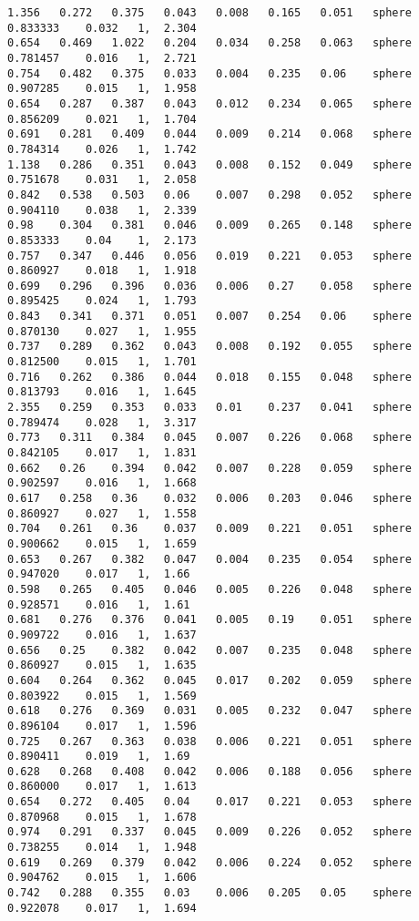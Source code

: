 {\begin{lstlisting}[caption={Datos obtenidos para la prueba de la esfera usando AGC.}]
1.356	0.272	0.375	0.043	0.008	0.165	0.051	sphere	0.833333	0.032	1, 	2.304
0.654	0.469	1.022	0.204	0.034	0.258	0.063	sphere	0.781457	0.016	1, 	2.721
0.754	0.482	0.375	0.033	0.004	0.235	0.06	sphere	0.907285	0.015	1, 	1.958
0.654	0.287	0.387	0.043	0.012	0.234	0.065	sphere	0.856209	0.021	1, 	1.704
0.691	0.281	0.409	0.044	0.009	0.214	0.068	sphere	0.784314	0.026	1, 	1.742
1.138	0.286	0.351	0.043	0.008	0.152	0.049	sphere	0.751678	0.031	1, 	2.058
0.842	0.538	0.503	0.06	0.007	0.298	0.052	sphere	0.904110	0.038	1, 	2.339
0.98	0.304	0.381	0.046	0.009	0.265	0.148	sphere	0.853333	0.04	1, 	2.173
0.757	0.347	0.446	0.056	0.019	0.221	0.053	sphere	0.860927	0.018	1, 	1.918
0.699	0.296	0.396	0.036	0.006	0.27	0.058	sphere	0.895425	0.024	1, 	1.793
0.843	0.341	0.371	0.051	0.007	0.254	0.06	sphere	0.870130	0.027	1, 	1.955
0.737	0.289	0.362	0.043	0.008	0.192	0.055	sphere	0.812500	0.015	1, 	1.701
0.716	0.262	0.386	0.044	0.018	0.155	0.048	sphere	0.813793	0.016	1, 	1.645
2.355	0.259	0.353	0.033	0.01	0.237	0.041	sphere	0.789474	0.028	1, 	3.317
0.773	0.311	0.384	0.045	0.007	0.226	0.068	sphere	0.842105	0.017	1, 	1.831
0.662	0.26	0.394	0.042	0.007	0.228	0.059	sphere	0.902597	0.016	1, 	1.668
0.617	0.258	0.36	0.032	0.006	0.203	0.046	sphere	0.860927	0.027	1, 	1.558
0.704	0.261	0.36	0.037	0.009	0.221	0.051	sphere	0.900662	0.015	1, 	1.659
0.653	0.267	0.382	0.047	0.004	0.235	0.054	sphere	0.947020	0.017	1, 	1.66
0.598	0.265	0.405	0.046	0.005	0.226	0.048	sphere	0.928571	0.016	1, 	1.61
0.681	0.276	0.376	0.041	0.005	0.19	0.051	sphere	0.909722	0.016	1, 	1.637
0.656	0.25	0.382	0.042	0.007	0.235	0.048	sphere	0.860927	0.015	1, 	1.635
0.604	0.264	0.362	0.045	0.017	0.202	0.059	sphere	0.803922	0.015	1, 	1.569
0.618	0.276	0.369	0.031	0.005	0.232	0.047	sphere	0.896104	0.017	1, 	1.596
0.725	0.267	0.363	0.038	0.006	0.221	0.051	sphere	0.890411	0.019	1, 	1.69
0.628	0.268	0.408	0.042	0.006	0.188	0.056	sphere	0.860000	0.017	1, 	1.613
0.654	0.272	0.405	0.04	0.017	0.221	0.053	sphere	0.870968	0.015	1, 	1.678
0.974	0.291	0.337	0.045	0.009	0.226	0.052	sphere	0.738255	0.014	1, 	1.948
0.619	0.269	0.379	0.042	0.006	0.224	0.052	sphere	0.904762	0.015	1, 	1.606
0.742	0.288	0.355	0.03	0.006	0.205	0.05	sphere	0.922078	0.017	1, 	1.694
\end{lstlisting}
}$ $ \\


